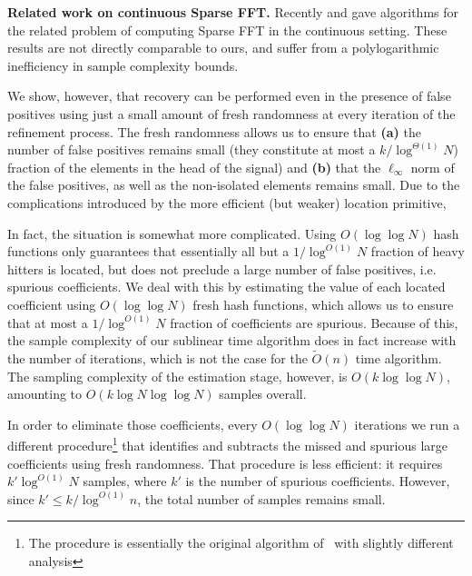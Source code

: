 {\bf Related work on continuous Sparse FFT.} Recently \cite{BCGLS} and \cite{PZ15} gave algorithms for the related problem of computing Sparse FFT in the continuous setting. These results are not directly comparable to ours, and suffer from a polylogarithmic  inefficiency in sample complexity bounds.

We show, however, that recovery can be performed even in the presence of false positives using just a small amount of fresh randomness at every iteration of the refinement process. The fresh randomness allows us to ensure that {\bf (a)}  the number of false positives remains small (they constitute at most a $k/\log^{\Theta(1)} N$) fraction of the elements in the head of the signal) and {\bf (b)} that the $\ell_\infty$ norm of the false positives, as well as the non-isolated elements remains small. 
Due to the complications introduced by the more efficient (but weaker) location primitive,
\fi 



In fact, the situation is somewhat more complicated. Using $O(\log\log N)$ hash functions only guarantees that essentially all but a $1/\log^{O(1)} N$ fraction of heavy hitters is located, but does not preclude a large number of false positives, i.e. spurious coefficients. We deal with this by estimating the value of each located coefficient using $O(\log \log N)$ fresh hash functions, which allows us to ensure that at most a $1/\log^{O(1)} N$ fraction of coefficients are spurious. Because of this, the sample complexity of our sublinear time algorithm does in fact increase with the number of iterations, which is not the case for the $\tilde O(n)$ time algorithm. The sampling complexity of the estimation stage, however, is $O(k\log\log N)$, amounting to $O(k\log N\log \log N)$ samples overall.


In order to eliminate those coefficients, every $O(\log\log N)$ iterations we run a different procedure\footnote{The procedure is essentially the original algorithm of~\cite{GMS} with slightly different analysis} that identifies and subtracts the missed and spurious large coefficients using fresh randomness.  That procedure is less efficient: it requires $k' \log^{O(1)} N$ samples, where $k'$ is the number of spurious coefficients. However, since $k' \le k/ \log^{O(1)} n$, the total number of samples remains small. 
\fi 
